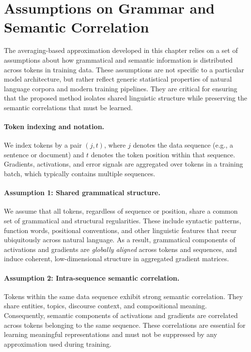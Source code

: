\section{Assumptions on Grammar and Semantic Correlation}
\label{sec:foundational_assumptions}

The averaging-based approximation developed in this chapter relies on a set of
assumptions about how grammatical and semantic information is distributed across
tokens in training data.
These assumptions are not specific to a particular model architecture, but rather
reflect generic statistical properties of natural language corpora and modern
training pipelines.
They are critical for ensuring that the proposed method isolates shared linguistic
structure while preserving the semantic correlations that must be learned.

\paragraph{Token indexing and notation.}
We index tokens by a pair $(j,t)$, where $j$ denotes the data sequence (e.g., a
sentence or document) and $t$ denotes the token position within that sequence.
Gradients, activations, and error signals are aggregated over tokens in a training
batch, which typically contains multiple sequences.

\paragraph{Assumption 1: Shared grammatical structure.}
We assume that all tokens, regardless of sequence or position, share a common set
of grammatical and structural regularities.
These include syntactic patterns, function words, positional conventions, and other
linguistic features that recur ubiquitously across natural language.
As a result, grammatical components of activations and gradients are \emph{globally
aligned} across tokens and sequences, and induce coherent, low-dimensional structure
in aggregated gradient matrices.

\paragraph{Assumption 2: Intra-sequence semantic correlation.}
Tokens within the same data sequence exhibit strong semantic correlation.
They share entities, topics, discourse context, and compositional meaning.
Consequently, semantic components of activations and gradients are correlated across
tokens belonging to the same sequence.
These correlations are essential for learning meaningful representations and must
not be suppressed by any approximation used during training.

